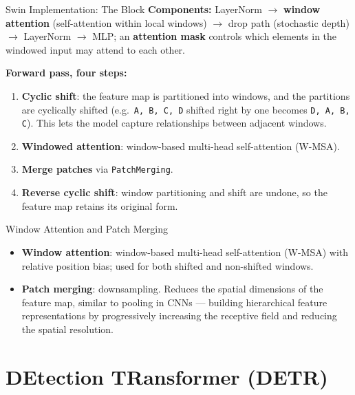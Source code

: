 \begin{frame}{Swin Implementation: The Block}
\textbf{Components:} LayerNorm $\to$ \textbf{window attention} (self-attention within local windows) $\to$ drop path (stochastic depth) $\to$ LayerNorm $\to$ MLP; an \textbf{attention mask} controls which elements in the windowed input may attend to each other.

\vspace{0.2cm}
\textbf{Forward pass, four steps:}
\begin{enumerate}
  \item \textbf{Cyclic shift}: the feature map is partitioned into windows, and the partitions are cyclically shifted (e.g.\ \texttt{A, B, C, D} shifted right by one becomes \texttt{D, A, B, C}). This lets the model capture relationships between adjacent windows.
  \item \textbf{Windowed attention}: window-based multi-head self-attention (W-MSA).
  \item \textbf{Merge patches} via \texttt{PatchMerging}.
  \item \textbf{Reverse cyclic shift}: window partitioning and shift are undone, so the feature map retains its original form.
\end{enumerate}
\end{frame}

\begin{frame}{Window Attention and Patch Merging}
\begin{itemize}
  \item \textbf{Window attention}: window-based multi-head self-attention (W-MSA) with relative position bias; used for both shifted and non-shifted windows.
  \item \textbf{Patch merging}: downsampling. Reduces the spatial dimensions of the feature map, similar to pooling in CNNs --- building hierarchical feature representations by progressively increasing the receptive field and reducing the spatial resolution.
\end{itemize}
\end{frame}

\section{DEtection TRansformer (DETR)}

